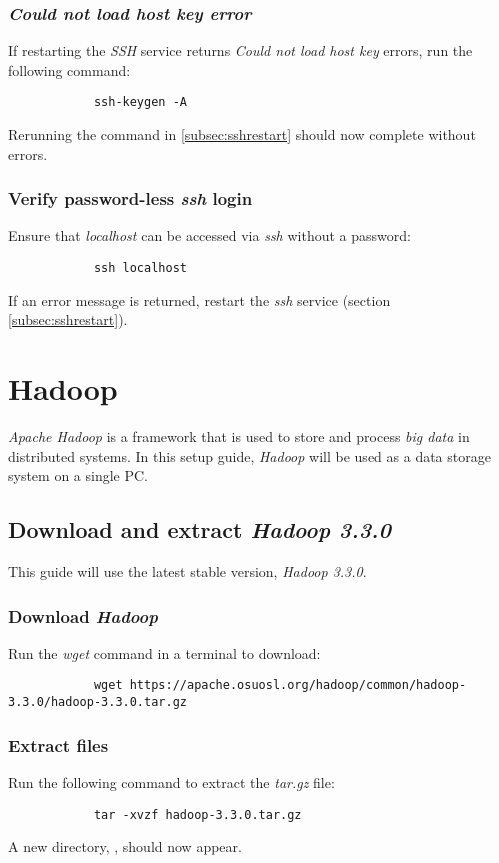 \documentclass{article}
\begin{document}
        \subsubsection{\emph{Could not load host key error}}
        If restarting the \emph{SSH} service returns \emph{Could not load host key} errors, run the
        following command:
        \begin{verbatim}
            ssh-keygen -A
        \end{verbatim}
        Rerunning the command in \ref{subsec:sshrestart} should now complete without errors.

        \subsubsection{Verify password-less \emph{ssh} login}
        Ensure that \emph{localhost} can be accessed via \emph{ssh} without a password:
        \begin{verbatim}
            ssh localhost
        \end{verbatim}
        If an error message is returned, restart the \emph{ssh} service (section \ref{subsec:sshrestart}).

\section{Hadoop}
\emph{Apache Hadoop} is a framework that is used to store and process \emph{big data} in distributed systems.
In this setup guide, \emph{Hadoop} will be used as a data storage system on a single PC.

    \subsection{Download and extract \emph{Hadoop 3.3.0}}
    This guide will use the latest stable version, \emph{Hadoop 3.3.0}.
    
        \subsubsection{Download \emph{Hadoop}}
        Run the \emph{wget} command in a terminal to download:
        \begin{verbatim}
            wget https://apache.osuosl.org/hadoop/common/hadoop-3.3.0/hadoop-3.3.0.tar.gz
        \end{verbatim}

        \subsubsection{Extract files}
        Run the following command to extract the \emph{tar.gz} file:
        \begin{verbatim}
            tar -xvzf hadoop-3.3.0.tar.gz
        \end{verbatim}
        A new directory, , should now appear.
\end{document}
